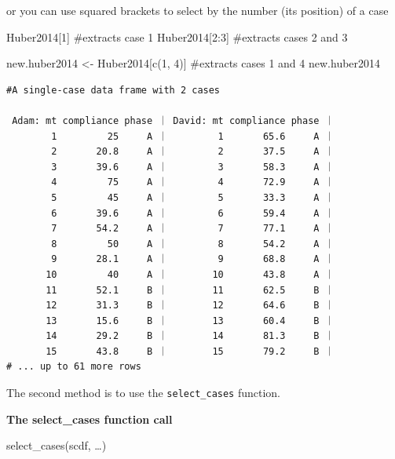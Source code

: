 \documentclass[
  letterpaper,
  DIV=11,
  numbers=noendperiod]{scrreprt}
\newenvironment{Shaded}{\begin{snugshade}}{\end{snugshade}}
\newcommand{\CommentTok}[1]{\textcolor[rgb]{0.37,0.37,0.37}{#1}}
\newcommand{\DecValTok}[1]{\textcolor[rgb]{0.68,0.00,0.00}{#1}}
\newcommand{\FunctionTok}[1]{\textcolor[rgb]{0.28,0.35,0.67}{#1}}
\newcommand{\NormalTok}[1]{\textcolor[rgb]{0.00,0.23,0.31}{#1}}
\newcommand{\OtherTok}[1]{\textcolor[rgb]{0.00,0.23,0.31}{#1}}
\newcommand{\SpecialCharTok}[1]{\textcolor[rgb]{0.37,0.37,0.37}{#1}}
\begin{document}
or you can use squared brackets to select by the number (its position)
of a case

\begin{Shaded}
\begin{Highlighting}[]
\NormalTok{Huber2014[}\DecValTok{1}\NormalTok{] }\CommentTok{\#extracts case 1}
\NormalTok{Huber2014[}\DecValTok{2}\SpecialCharTok{:}\DecValTok{3}\NormalTok{] }\CommentTok{\#extracts cases 2 and 3}
\end{Highlighting}
\end{Shaded}

\begin{Shaded}
\begin{Highlighting}[]
\NormalTok{new.huber2014 }\OtherTok{\textless{}{-}}\NormalTok{ Huber2014[}\FunctionTok{c}\NormalTok{(}\DecValTok{1}\NormalTok{, }\DecValTok{4}\NormalTok{)] }\CommentTok{\#extracts cases 1 and 4}
\NormalTok{new.huber2014}
\end{Highlighting}
\end{Shaded}

\begin{verbatim}
#A single-case data frame with 2 cases

 Adam: mt compliance phase ｜ David: mt compliance phase ｜
        1         25     A ｜         1       65.6     A ｜
        2       20.8     A ｜         2       37.5     A ｜
        3       39.6     A ｜         3       58.3     A ｜
        4         75     A ｜         4       72.9     A ｜
        5         45     A ｜         5       33.3     A ｜
        6       39.6     A ｜         6       59.4     A ｜
        7       54.2     A ｜         7       77.1     A ｜
        8         50     A ｜         8       54.2     A ｜
        9       28.1     A ｜         9       68.8     A ｜
       10         40     A ｜        10       43.8     A ｜
       11       52.1     B ｜        11       62.5     B ｜
       12       31.3     B ｜        12       64.6     B ｜
       13       15.6     B ｜        13       60.4     B ｜
       14       29.2     B ｜        14       81.3     B ｜
       15       43.8     B ｜        15       79.2     B ｜
# ... up to 61 more rows
\end{verbatim}

The second method is to use the \texttt{select\_cases} function.

\begin{tcolorbox}[enhanced jigsaw, breakable, rightrule=.15mm, bottomrule=.15mm, arc=.35mm, colback=white, colframe=quarto-callout-tip-color-frame, opacityback=0, leftrule=.75mm, toprule=.15mm, left=2mm]
\begin{minipage}[t]{5.5mm}
\textcolor{quarto-callout-tip-color}{\faLightbulb}
\end{minipage}%
\begin{minipage}[t]{\textwidth - 5.5mm}

\textbf{The select\_cases function call}\vspace{2mm}

select\_cases(scdf, \ldots)

\end{minipage}%
\end{tcolorbox}
\end{document}
